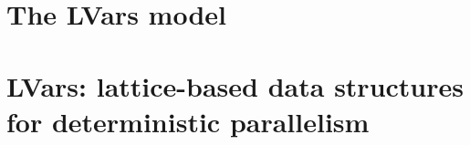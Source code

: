 \ifdefined\JOURNAL
\chapter{The LVars model}\label{ch:lvars} %
\fi

\ifdefined\DISSERTATION
\chapter{LVars: lattice-based data structures for deterministic parallelism}\label{ch:lvars} %
\fi















